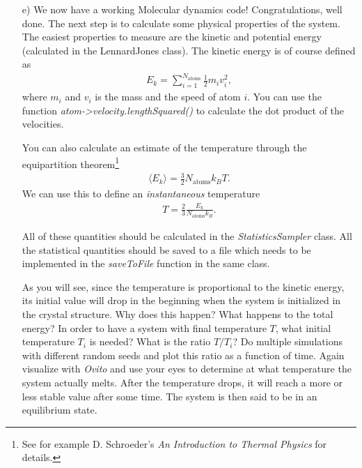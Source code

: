 \documentclass[a4wide,12pt]{article}
\begin{document}
\begin{enumerate}
\item[e)]
We now have a working Molecular dynamics code! Congratulations, well done. The next step is to calculate some physical properties of the system. The easiest properties to measure are the kinetic and potential energy (calculated in the LennardJones class). The kinetic energy is of course defined as
\begin{align}
	E_k = \sum_{i=1}^{N_\text{atoms}} \frac{1}{2} m_i v_i^2,
\end{align}
where $m_i$ and $v_i$ is the mass and the speed of atom $i$. You can use the function \textit{atom->velocity.lengthSquared()} to calculate the dot product of the velocities. 

You can also calculate an estimate of the temperature through the equipartition theorem\footnote{See for example D. Schroeder's \textit{An Introduction to Thermal Physics} for details.}
\begin{align}
	\langle E_k \rangle = \frac{3}{2}N_\text{atoms} k_B T.
\end{align}
We can use this to define an \textit{instantaneous} temperature
\begin{align}
	\label{eq:temperature}
	T = \frac{2}{3}\frac{E_k}{N_\text{atoms} k_B}.
\end{align}

All of these quantities should be calculated in the \textit{StatisticsSampler} class. All the statistical quantities should be saved to a file which needs to be implemented in the \textit{saveToFile} function in the same class. 

As you will see, since the temperature is proportional to the kinetic energy, its initial value will drop in the beginning when the system is initialized in the crystal structure. Why does this happen? What happens to the total energy? In order to have a system with final temperature $T$, what initial temperature $T_i$ is needed? What is the ratio $T/T_i$? Do multiple simulations with different random seeds and plot this ratio as a function of time. Again visualize with \textit{Ovito} and use your eyes to determine at what temperature the system actually melts. After the temperature drops, it will reach a more or less stable value after some time. The system is then said to be in an equilibrium state.


\end{enumerate}
\end{document}
